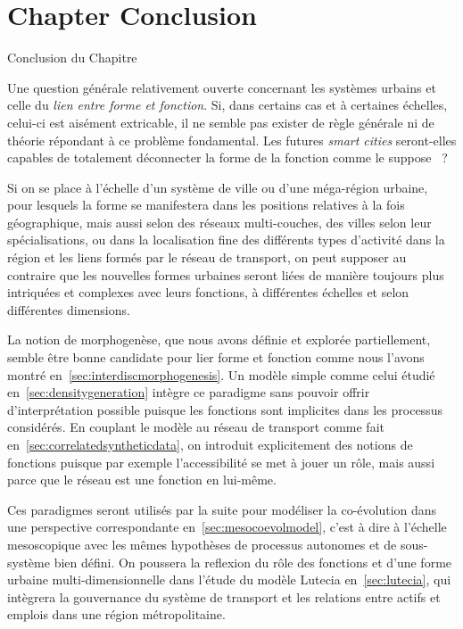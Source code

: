 




\newpage


\section*{Chapter Conclusion}{Conclusion du Chapitre}



Une question générale relativement ouverte concernant les systèmes urbains et celle du \emph{lien entre forme et fonction}. Si, dans certains cas et à certaines échelles, celui-ci est aisément extricable, il ne semble pas exister de règle générale ni de théorie répondant à ce problème fondamental. Les futures \emph{smart cities} seront-elles capables de totalement déconnecter la forme de la fonction comme le suppose~\cite{batty2017age} ?

Si on se place à l'échelle d'un système de ville ou d'une méga-région urbaine, pour lesquels la forme se manifestera dans les positions relatives à la fois géographique, mais aussi selon des réseaux multi-couches, des villes selon leur spécialisations, ou dans la localisation fine des différents types d'activité dans la région et les liens formés par le réseau de transport, on peut supposer au contraire que les nouvelles formes urbaines seront liées de manière toujours plus intriquées et complexes avec leurs fonctions, à différentes échelles et selon différentes dimensions.

La notion de morphogenèse, que nous avons définie et explorée partiellement, semble être bonne candidate pour lier forme et fonction comme nous l'avons montré en~\ref{sec:interdiscmorphogenesis}. Un modèle simple comme celui étudié en~\ref{sec:densitygeneration} intègre ce paradigme sans pouvoir offrir d'interprétation possible puisque les fonctions sont implicites dans les processus considérés. En couplant le modèle au réseau de transport comme fait en~\ref{sec:correlatedsyntheticdata}, on introduit explicitement des notions de fonctions puisque par exemple l'accessibilité se met à jouer un rôle, mais aussi parce que le réseau est une fonction en lui-même.

Ces paradigmes seront utilisés par la suite pour modéliser la co-évolution dans une perspective correspondante en~\ref{sec:mesocoevolmodel}, c'est à dire à l'échelle mesoscopique avec les mêmes hypothèses de processus autonomes et de sous-système bien défini. On poussera la reflexion du rôle des fonctions et d'une forme urbaine multi-dimensionnelle dans l'étude du modèle Lutecia en~\ref{sec:lutecia}, qui intègrera la gouvernance du système de transport et les relations entre actifs et emplois dans une région métropolitaine.




\stars



